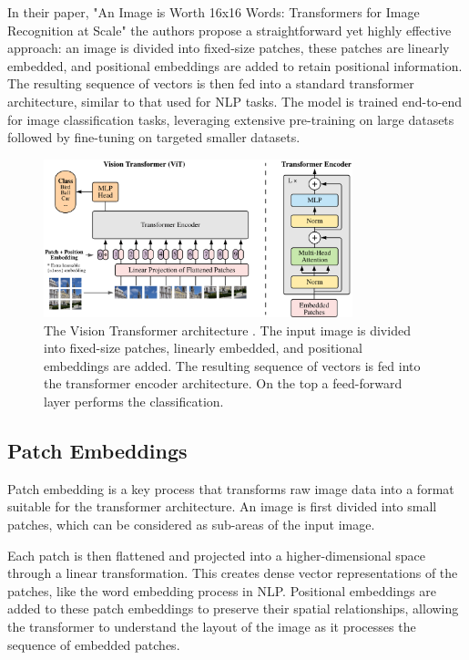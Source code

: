 In their paper, "An Image is Worth 16x16 Words: Transformers for 
Image Recognition at Scale" \cite{vit} the authors propose a straightforward yet 
highly 
effective approach: an image is divided into fixed-size patches, these patches 
are linearly embedded, and positional embeddings are added to retain positional 
information. The resulting sequence of vectors is then fed into a standard 
transformer architecture, similar to that used for NLP tasks. The model is 
trained end-to-end for image classification tasks, leveraging extensive 
pre-training on large datasets followed by fine-tuning on targeted smaller 
datasets.

\begin{figure}
    \centering
    \includegraphics[width=0.8\textwidth]{images/vit/vit_scheme.png}
    \vspace*{0.3cm}
    \caption{The Vision Transformer architecture \cite{vit}. The input image is divided 
    into fixed-size patches, linearly embedded, and positional embeddings are 
    added. The resulting sequence of vectors is fed into the transformer encoder 
    architecture. On the top a feed-forward layer performs the classification.}
    \label{fig:vit_architecture}
\end{figure}

\subsection{Patch Embeddings}
Patch embedding is a key process that transforms raw image data into a format 
suitable for the transformer architecture. An image is first divided into small 
patches, which can be considered as sub-areas of the input image. 

Each patch is then flattened and projected into a higher-dimensional space 
through a linear transformation. This creates dense vector representations of 
the patches, like the word embedding process in NLP. 
Positional embeddings are added to these patch embeddings to preserve their 
spatial relationships, allowing the transformer to understand the layout of the 
image as it processes the sequence of embedded patches. 

